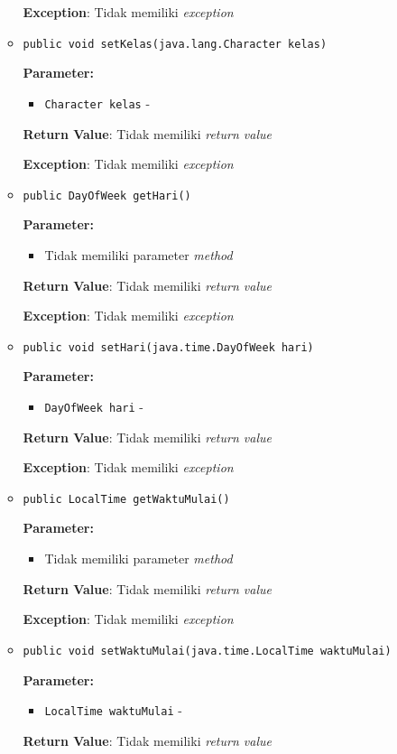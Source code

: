 \documentclass{article}
\begin{document}
\begin{enumerate}
\begin{itemize}
\textbf{Exception}: Tidak memiliki \textit{exception}

\item \texttt{public void setKelas(java.lang.Character kelas)}

\textbf{Parameter:}
\begin{itemize}
\item \texttt{Character kelas} - 
\end{itemize}
\textbf{Return Value}: Tidak memiliki \textit{return value}

\textbf{Exception}: Tidak memiliki \textit{exception}

\item \texttt{public DayOfWeek getHari()}

\textbf{Parameter:}
\begin{itemize}
\item Tidak memiliki parameter \textit{method}
\end{itemize}
\textbf{Return Value}: Tidak memiliki \textit{return value}

\textbf{Exception}: Tidak memiliki \textit{exception}

\item \texttt{public void setHari(java.time.DayOfWeek hari)}

\textbf{Parameter:}
\begin{itemize}
\item \texttt{DayOfWeek hari} - 
\end{itemize}
\textbf{Return Value}: Tidak memiliki \textit{return value}

\textbf{Exception}: Tidak memiliki \textit{exception}

\item \texttt{public LocalTime getWaktuMulai()}

\textbf{Parameter:}
\begin{itemize}
\item Tidak memiliki parameter \textit{method}
\end{itemize}
\textbf{Return Value}: Tidak memiliki \textit{return value}

\textbf{Exception}: Tidak memiliki \textit{exception}

\item \texttt{public void setWaktuMulai(java.time.LocalTime waktuMulai)}

\textbf{Parameter:}
\begin{itemize}
\item \texttt{LocalTime waktuMulai} - 
\end{itemize}
\textbf{Return Value}: Tidak memiliki \textit{return value}


\end{itemize}
\end{enumerate}
\end{document}

